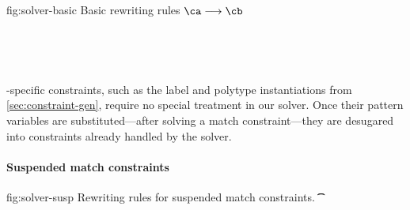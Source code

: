\documentclass[acmsmall,screen,nonacm,review]{acmart}
\begin{document}
\begin{mathparfig}[htpb!]
  {fig:solver-basic}
  {Basic rewriting rules $\ca \csolve \cb$}
  \rewrite[S-Unif]
    {\upa \quad \upa \unif \upb}
    {\upb}

  \rewrite[S-False]
    {\C\where\cfalse \quad \C \neq \square}
    {\cfalse}

  \rewrite[S-Let]
    {\clet \x \tv \ca \cb}
    {\cletr \x \tv \eset \ca \cb}

    {\cexists \tv {\ca \cand \cb}}
  \\
    {\cletr \x \tv {\tvs, \tvb} \ca \cb}

    {\cexists \tvb {\clet \x \tvs \ca \cb}}
  \\
    {\ca \cand \cletr \x \tv \tvs \cb \cc}

    {\cc \cand \Clet \x \tv \ca \cb}
\end{mathparfig}



\OML-specific constraints, such as the label and polytype instantiations from
\cref{sec:constraint-gen}, require no special treatment in our solver. Once
their pattern variables are substituted---after solving a match
constraint---they are desugared into constraints already handled by the solver.

\paragraph{Suspended match constraints}

\begin{mathparfig}
  {fig:solver-susp}
  {Rewriting rules for suspended match constraints.}
    {\cmatched \t {\shape \t} \cbrs}

    {\C\where{\cmatched \tv {\shape \t} \cbrs}}
\end{mathparfig}
\end{document}
